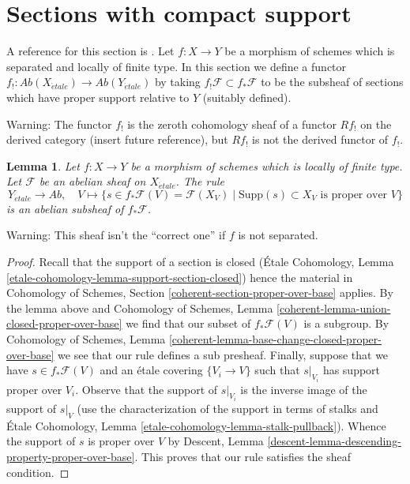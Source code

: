 \documentclass{stacks-project}
\theoremstyle{plain}
\newtheorem{lemma}[subsection]{Lemma}
\theoremstyle{definition}
\theoremstyle{remark}
\numberwithin{equation}{subsection}
\def\etale{{\acute{e}tale}}
\begin{document}
\section{Sections with compact support}
\label{section-compact-support}

\noindent
A reference for this section is \cite[Exposee XVII, Section 6]{SGA4}.
Let $f : X \to Y$ be a morphism of schemes which is separated and
locally of finite type. In this section we define a functor
$f_! : \textit{Ab}(X_\etale) \to \textit{Ab}(Y_\etale)$
by taking $f_!\mathcal{F} \subset f_*\mathcal{F}$
to be the subsheaf of sections which have proper support relative to $Y$
(suitably defined).

\medskip\noindent
Warning: The functor $f_!$ is the zeroth cohomology sheaf of a functor
$Rf_!$ on the derived category (insert future reference), but
$Rf_!$ is not the derived functor of $f_!$.

\begin{lemma}
\label{lemma-f-shriek-separated}
Let $f : X \to Y$ be a morphism of schemes which is locally of finite type.
Let $\mathcal{F}$ be an abelian sheaf on $X_\etale$. The rule
$$
Y_\etale \longrightarrow \textit{Ab},\quad
V \longmapsto \{s \in f_*\mathcal{F}(V) = \mathcal{F}(X_V) \mid
\text{Supp}(s) \subset X_V \text{ is proper over }V\}
$$
is an abelian subsheaf of $f_*\mathcal{F}$.
\end{lemma}

\noindent
Warning: This sheaf isn't the ``correct one'' if $f$ is not separated.

\begin{proof}
Recall that the support of a section is closed
(\'Etale Cohomology, Lemma \ref{etale-cohomology-lemma-support-section-closed})
hence the material in
Cohomology of Schemes, Section \ref{coherent-section-proper-over-base}
applies. By the lemma above and
Cohomology of Schemes, Lemma \ref{coherent-lemma-union-closed-proper-over-base}
we find that our subset of $f_*\mathcal{F}(V)$ is a subgroup.
By Cohomology of Schemes, Lemma
\ref{coherent-lemma-base-change-closed-proper-over-base}
we see that our rule defines a sub presheaf.
Finally, suppose that we have $s \in f_*\mathcal{F}(V)$
and an \'etale covering $\{V_i \to V\}$ such that
$s|_{V_i}$ has support proper over $V_i$.
Observe that the support of $s|_{V_i}$ is the inverse
image of the support of $s|_V$ (use the characterization
of the support in terms of stalks and
\'Etale Cohomology, Lemma \ref{etale-cohomology-lemma-stalk-pullback}).
Whence the support of $s$ is proper over $V$ by
Descent, Lemma \ref{descent-lemma-descending-property-proper-over-base}.
This proves that our rule satisfies the sheaf condition.
\end{proof}
\end{document}
